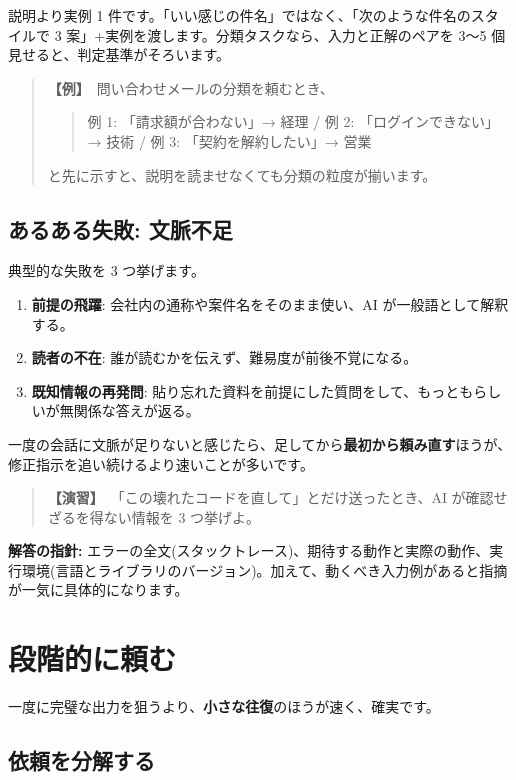 \documentclass{article}
\begin{document}
説明より実例 1 件です。「いい感じの件名」ではなく、「次のような件名のスタイルで 3 案」+実例を渡します。分類タスクなら、入力と正解のペアを 3〜5 個見せると、判定基準がそろいます。

\begin{quote}
\textbf{【例】}\ 問い合わせメールの分類を頼むとき、
\begin{quote}
例 1: 「請求額が合わない」→ 経理 / 例 2: 「ログインできない」→ 技術 / 例 3: 「契約を解約したい」→ 営業
\end{quote}
と先に示すと、説明を読ませなくても分類の粒度が揃います。
\end{quote}

\subsection{あるある失敗: 文脈不足}

典型的な失敗を 3 つ挙げます。

\begin{enumerate}
\item \textbf{前提の飛躍}: 会社内の通称や案件名をそのまま使い、AI が一般語として解釈する。
\item \textbf{読者の不在}: 誰が読むかを伝えず、難易度が前後不覚になる。
\item \textbf{既知情報の再発問}: 貼り忘れた資料を前提にした質問をして、もっともらしいが無関係な答えが返る。
\end{enumerate}

一度の会話に文脈が足りないと感じたら、足してから\textbf{最初から頼み直す}ほうが、修正指示を追い続けるより速いことが多いです。

\begin{quote}
\textbf{【演習】}\ 「この壊れたコードを直して」とだけ送ったとき、AI が確認せざるを得ない情報を 3 つ挙げよ。
\end{quote}

\textbf{解答の指針:} エラーの全文(スタックトレース)、期待する動作と実際の動作、実行環境(言語とライブラリのバージョン)。加えて、動くべき入力例があると指摘が一気に具体的になります。

\section{段階的に頼む}

一度に完璧な出力を狙うより、\textbf{小さな往復}のほうが速く、確実です。

\subsection{依頼を分解する}
\end{document}
